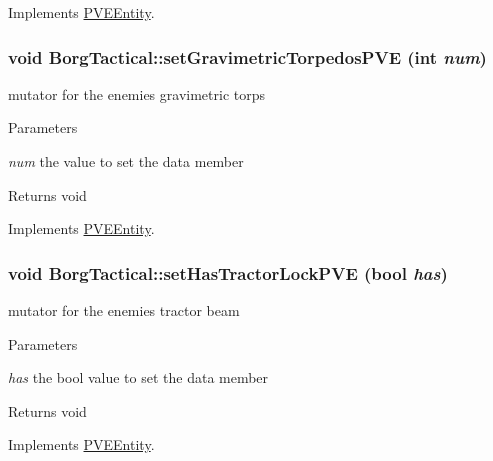 Implements \hyperlink{classPVEEntity}{PVEEntity}.

\hypertarget{classBorgTactical_ac2c1e7ad4fc13eb3ea9c47adf9532092}{
\subsubsection[{setGravimetricTorpedosPVE}]{\setlength{\rightskip}{0pt plus 5cm}void BorgTactical::setGravimetricTorpedosPVE (int {\em num})}}
\label{d0/d4e/classBorgTactical_ac2c1e7ad4fc13eb3ea9c47adf9532092}
mutator for the enemies gravimetric torps


\begin{DoxyParams}{Parameters}
\item[{\em num}]the value to set the data member\end{DoxyParams}
\begin{DoxyReturn}{Returns}
void 
\end{DoxyReturn}


Implements \hyperlink{classPVEEntity}{PVEEntity}.

\hypertarget{classBorgTactical_a57b590444887110e9f09915413a62aaf}{
\subsubsection[{setHasTractorLockPVE}]{\setlength{\rightskip}{0pt plus 5cm}void BorgTactical::setHasTractorLockPVE (bool {\em has})}}
\label{d0/d4e/classBorgTactical_a57b590444887110e9f09915413a62aaf}
mutator for the enemies tractor beam


\begin{DoxyParams}{Parameters}
\item[{\em has}]the bool value to set the data member\end{DoxyParams}
\begin{DoxyReturn}{Returns}
void 
\end{DoxyReturn}


Implements \hyperlink{classPVEEntity}{PVEEntity}.

